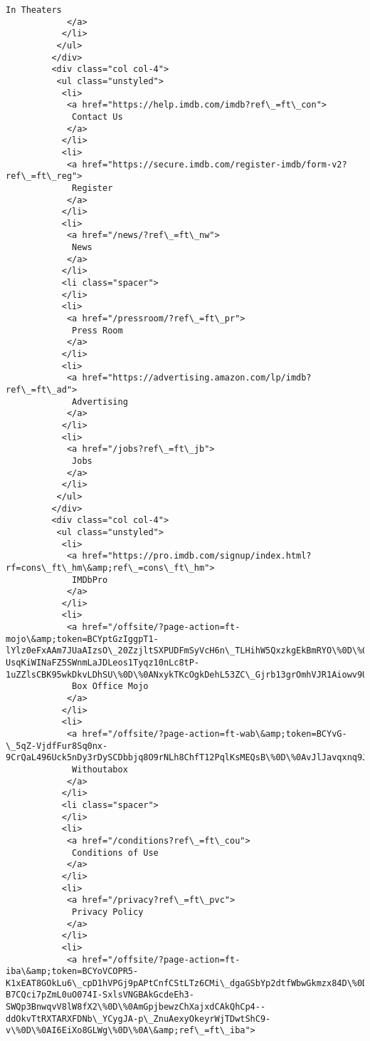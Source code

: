 \documentclass[11pt]{article}
\begin{document}
\begin{Verbatim}[commandchars=\\\{\}]
             In Theaters
            </a>
           </li>
          </ul>
         </div>
         <div class="col col-4">
          <ul class="unstyled">
           <li>
            <a href="https://help.imdb.com/imdb?ref\_=ft\_con">
             Contact Us
            </a>
           </li>
           <li>
            <a href="https://secure.imdb.com/register-imdb/form-v2?ref\_=ft\_reg">
             Register
            </a>
           </li>
           <li>
            <a href="/news/?ref\_=ft\_nw">
             News
            </a>
           </li>
           <li class="spacer">
           </li>
           <li>
            <a href="/pressroom/?ref\_=ft\_pr">
             Press Room
            </a>
           </li>
           <li>
            <a href="https://advertising.amazon.com/lp/imdb?ref\_=ft\_ad">
             Advertising
            </a>
           </li>
           <li>
            <a href="/jobs?ref\_=ft\_jb">
             Jobs
            </a>
           </li>
          </ul>
         </div>
         <div class="col col-4">
          <ul class="unstyled">
           <li>
            <a href="https://pro.imdb.com/signup/index.html?rf=cons\_ft\_hm\&amp;ref\_=cons\_ft\_hm">
             IMDbPro
            </a>
           </li>
           <li>
            <a href="/offsite/?page-action=ft-mojo\&amp;token=BCYptGzIggpT1-lYlz0eFxAAm7JUaAIzsO\_20ZzjltSXPUDFmSyVcH6n\_TLHihW5QxzkgEkBmRYO\%0D\%0APg67599AFNw9AZ7v-UsqKiWINaFZ5SWnmLaJDLeos1Tyqz10nLc8tP-1uZZlsCBK95wkDkvLDhSU\%0D\%0ANxykTKcOgkDehL53ZC\_Gjrb13grOmhVJR1Aiowv9UWHK\%0D\%0A\&amp;ref\_=ft\_bom">
             Box Office Mojo
            </a>
           </li>
           <li>
            <a href="/offsite/?page-action=ft-wab\&amp;token=BCYvG-\_5qZ-VjdfFur8Sq0nx-9CrQaL496Uck5nDy3rDySCDbbjq8O9rNLh8ChfT12PqlKsMEQsB\%0D\%0AvJlJavqxnq9J9ERURtN8eRHCUzJzL7ja8xhwj9TfHahTD\_22RgTWRx91HsQhINHMaSAEhNPEcyJE\%0D\%0AsNuQSpjNrUjO\_IoQBeV8CkWHTNJaSKTt7r7VVocNcjuc\%0D\%0A\&amp;ref\_=ft\_wab">
             Withoutabox
            </a>
           </li>
           <li class="spacer">
           </li>
           <li>
            <a href="/conditions?ref\_=ft\_cou">
             Conditions of Use
            </a>
           </li>
           <li>
            <a href="/privacy?ref\_=ft\_pvc">
             Privacy Policy
            </a>
           </li>
           <li>
            <a href="/offsite/?page-action=ft-iba\&amp;token=BCYoVCOPR5-K1xEAT8GOkLu6\_cpD1hVPGj9pAPtCnfCStLTz6CMi\_dgaGSbYp2dtfWbwGkmzx84D\%0D\%0AvVyCESktijLHz6dmMcNc-B7CQci7pZmL0uO074I-SxlsVNGBAkGcdeEh3-SWQp3BnwqvV8lW8fX2\%0D\%0AmGpjbewzChXajxdCAkQhCp4--ddOkvTtRXTARXFDNb\_YCygJA-p\_ZnuAexyOkeyrWjTDwtShC9-v\%0D\%0AI6EiXo8GLWg\%0D\%0A\&amp;ref\_=ft\_iba">

\end{Verbatim}
\end{document}

